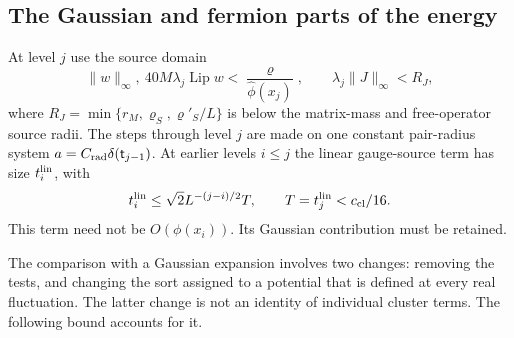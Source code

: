 \documentclass[11pt,letterpaper,reqno]{amsart}
\theoremstyle{definition}
\theoremstyle{remark}
\begin{document}
\subsection{The Gaussian and fermion parts of the energy}

At level $j$ use the source domain
\begin{equation}\label{eq:qcd-level-source-domain}
 \|w\|_\infty,\ 40M\lambda_j\operatorname{Lip}w
       <\frac{\varrho}{\widehat\phi(x_j)},\qquad
 \lambda_j\|J\|_\infty<R_J,
\end{equation}
where $R_J=\min\{r_M,\varrho_S,\varrho'_S/L\}$ is below the
matrix-mass and free-operator source radii. The steps through
level $j$ are made on one constant pair-radius system
$a=C_{\rm rad}\delta(\mathsf t_{j-1})$. At earlier levels $i\le j$ the
linear gauge-source term has size $t_i^{\rm lin}$, with
\[
 t_i^{\rm lin}\le\sqrt2L^{-(j-i)/2}T,\qquad T=t_j^{\rm lin}<c_{\rm cl}/16.
\]
This term need not be $O(\phi(x_i))$. Its Gaussian contribution
must be retained.

The comparison with a Gaussian expansion involves two changes:
removing the tests, and changing the sort assigned to a potential
that is defined at every real fluctuation. The latter change is
not an identity of individual cluster terms. The following bound
accounts for it.
\end{document}
